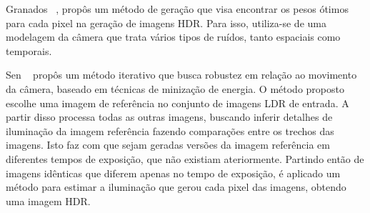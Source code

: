 Granados \etal~\cite{granados}, propôs um método de geração que visa encontrar os pesos ótimos para cada pixel na geração de imagens HDR. Para isso, utiliza-se de uma modelagem da câmera que trata vários tipos de ruídos, tanto espaciais como temporais.


Sen \etal~\cite{hdrMovimento} propôs um método iterativo que busca robustez em relação ao movimento da câmera, baseado em técnicas de minização de energia. O método proposto escolhe uma imagem de referência no conjunto de imagens LDR de entrada. A partir disso processa todas as outras imagens, buscando inferir detalhes de iluminação da imagem referência fazendo comparações entre os trechos das imagens. Isto faz com que sejam geradas versões da imagem referência em diferentes tempos de exposição, que não existiam ateriormente. Partindo então de imagens idênticas que diferem apenas no tempo de exposição, é aplicado um método para estimar a iluminação que gerou cada pixel das imagens, obtendo uma imagem HDR.
